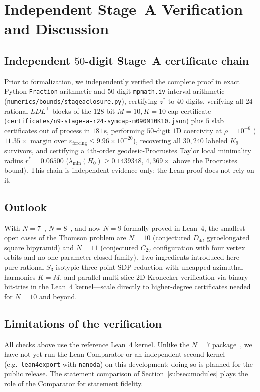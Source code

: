 \documentclass[11pt,reqno]{amsart}
\renewcommand{\_}{\origunderscore\allowbreak}
\theoremstyle{definition}
\begin{document}
\section{Independent Stage~A Verification and Discussion}\label{sec:discussion}

\subsection{Independent $50$-digit Stage~A certificate chain}\label{subsec:stage-a}
Prior to formalization, we independently verified the complete proof in exact Python \texttt{Fraction} arithmetic and $50$-digit \texttt{mpmath.iv} interval arithmetic (\texttt{numerics/bounds/stage\_a\_closure.py}), certifying $z^*$ to $40$ digits, verifying all $24$ rational $LDL^\top$ blocks of the $128$-bit $M=10, K=10$ cap certificate (\texttt{certificates/n9-stage-a-r24-symcap-m090\_M10K10.json}) plus $5$ slab certificates out of process in $181\,\mathrm{s}$, performing $50$-digit $1\text{D}$ coercivity at $\rho = 10^{-6}$ ($11.35\times$ margin over $\varepsilon_{\mathrm{forcing}} \le 9.96 \times 10^{-20}$), recovering all $30{,}240$ labeled $K_9$ survivors, and certifying a $4\text{th}$-order geodesic-Procrustes Taylor local minimality radius $r^* = 0.06500$ ($\lambda_{\min}(H_0) \ge 0.1439348$, $4{,}369\times$ above the Procrustes bound). This chain is independent evidence only; the Lean proof does not rely on it.

\subsection{Outlook}\label{subsec:outlook}
With $N = 7$~\cite{ValsN72026}, $N = 8$~\cite{KLT2026,TZ2026}, and now $N = 9$ formally proved in Lean~4, the smallest open cases of the Thomson problem are $N = 10$ (conjectured $D_{4d}$ gyroelongated square bipyramid) and $N = 11$ (conjectured $C_{2v}$ configuration with four vertex orbits and no one-parameter closed family).
Two ingredients introduced here---pure-rational $S_3$-isotypic three-point SDP reduction with uncapped azimuthal harmonics $K = M$, and parallel multi-slice $2\text{D}$-Kronecker verification via binary bit-tries in the Lean~4 kernel---scale directly to higher-degree certificates needed for $N = 10$ and beyond.

\subsection*{Limitations of the verification}
All checks above use the reference Lean~4 kernel. Unlike the $N=7$ package~\cite{ValsN72026}, we have not yet run the Lean Comparator or an independent second kernel (e.g.\ \texttt{lean4export} with \texttt{nanoda}) on this development; doing so is planned for the public release. The statement comparison of Section~\ref{subsec:modules} plays the role of the Comparator for statement fidelity.
\end{document}
